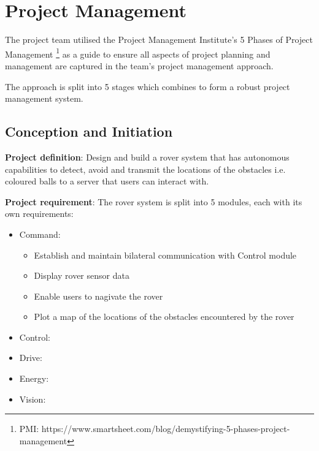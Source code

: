 \documentclass[11pt, a4paper]{article}
\begin{document}
\tableofcontents
\pagebreak

\section{Project Management}

The project team utilised the Project Management Institute's 5 Phases of Project Management \footnote{PMI: https://www.smartsheet.com/blog/demystifying-5-phases-project-management} as a guide to ensure all aspects of project planning and management are captured in the team's project management approach. 

The approach is split into 5 stages which combines to form a robust project management system.

\subsection{Conception and Initiation}

\textbf{Project definition}: Design and build a rover system that has autonomous capabilities to detect, avoid and transmit the locations of the obstacles i.e. coloured balls to a server that users can interact with.

\textbf{Project requirement}: The rover system is split into 5 modules, each with its own requirements:
\begin{itemize}
    \item Command:
    \begin{itemize}
        \item Establish and maintain bilateral communication with Control module 
        \item Display rover sensor data 
        \item Enable users to nagivate the rover 
        \item Plot a map of the locations of the obstacles encountered by the rover   
    \end{itemize}

    \item Control:
    
    \item Drive:
    
    \item Energy:
    
    \item Vision:
\end{itemize}
\end{document}
